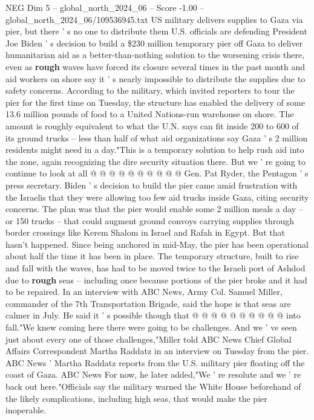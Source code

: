 \begin{textsample}{NEG Dim 5 – global\_north\_2024\_06 – Score -1.00 – global\_north\_2024\_06/109536945.txt}  \label{ex:f5_neg_089}
US military delivers supplies to Gaza via pier, but there ' s no one to distribute them U.S. officials are defending President Joe Biden ' s decision to build a \$230 million temporary pier off Gaza to deliver humanitarian aid as a better-than-nothing solution to the worsening crisis there, even as \textbf{rough} waves have forced its closure several times in the past month and aid workers on shore say it ' s nearly impossible to distribute the supplies due to safety concerns.
According to the military, which invited reporters to tour the pier for the first time on Tuesday, the structure has enabled the delivery of some 13.6 million pounds of food to a United Nations-run warehouse on shore.
The amount is roughly equivalent to what the U.N. says can fit inside 200 to 600 of its ground trucks -- less than half of what aid organizations say Gaza ' s 2 million residents might need in a day."This is a temporary solution to help rush aid into the zone, again recognizing the dire security situation there.
But we ' re going to continue to look at all @ @ @ @ @ @ @ @ @ @ Gen.
Pat Ryder, the Pentagon ' s press secretary.
Biden ' s decision to build the pier came amid frustration with the Israelis that they were allowing too few aid trucks inside Gaza, citing security concerns.
The plan was that the pier would enable some 2 million meals a day -- or 150 trucks -- that could augment ground convoys carrying supplies through border crossings like Kerem Shalom in Israel and Rafah in Egypt.
But that hasn't happened.
Since being anchored in mid-May, the pier has been operational about half the time it has been in place.
The temporary structure, built to rise and fall with the waves, has had to be moved twice to the Israeli port of Ashdod due to \textbf{rough} seas -- including once because portions of the pier broke and it had to be repaired.
In an interview with ABC News, Army Col.
Samuel Miller, commander of the 7th Transportation Brigade, said the hope is that seas are calmer in July.
He said it ' s possible though that @ @ @ @ @ @ @ @ @ @ into fall."We knew coming here there were going to be challenges.
And we ' ve seen just about every one of those challenges,"Miller told ABC News Chief Global Affairs Correspondent Martha Raddatz in an interview on Tuesday from the pier.
ABC News ' Martha Raddatz reports from the U.S. military pier floating off the coast of Gaza.
ABC News For now, he later added,"We ' re resolute and we ' re back out here."Officials say the military warned the White House beforehand of the likely complications, including high seas, that would make the pier inoperable.

\end{textsample}
